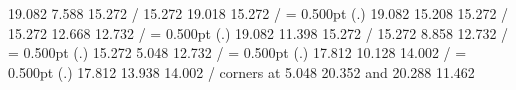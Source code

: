 { 19.082  7.588 15.272 /
 15.272 19.018 15.272 /
%
%
\linethickness= 0.500pt
\setplotsymbol ({\thinlinefont .})
 19.082 15.208 15.272 /
 15.272 12.668 12.732 /
%
%
\linethickness= 0.500pt
\setplotsymbol ({\thinlinefont .})
 19.082 11.398 15.272 /
 15.272  8.858 12.732 /
%
%
\linethickness= 0.500pt
\setplotsymbol ({\thinlinefont .})
 15.272  5.048 12.732 /
%
%
\linethickness= 0.500pt
\setplotsymbol ({\thinlinefont .})
 17.812 10.128 14.002 /
%
%
\linethickness= 0.500pt
\setplotsymbol ({\thinlinefont .})
 17.812 13.938 14.002 /
\linethickness=0pt
\putrectangle corners at  5.048 20.352 and 20.288 11.462
\endpicture}

